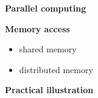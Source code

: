\begin{frame}\begin{center}
		\LARGE\textbf{Parallel computing}
\end{center}\end{frame}
\begin{frame}\textbf{Memory access}\vspace{0.3cm}

\begin{itemize}\setlength\itemsep{1em}
    \item shared memory
    \item distributed memory
\end{itemize}

\end{frame}
\begin{frame}
  	\begin{figure}[htp]\centering
  	\end{figure}
\end{frame}
\begin{frame}\textbf{Practical illustration}\vspace{0.3cm}
  	\begin{figure}[htp]\centering
  	\end{figure}
\end{frame}
